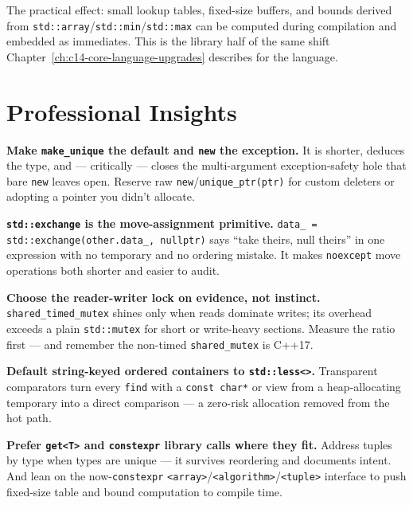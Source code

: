 The practical effect: small lookup tables, fixed-size buffers, and bounds derived from \texttt{std::array}/\texttt{std::min}/\texttt{std::max} can be computed during compilation and embedded as immediates. This is the library half of the same shift Chapter~\ref{ch:c14-core-language-upgrades} describes for the language.

\section{Professional Insights}
\label{sec:c14-stdlib-insights}

\textbf{Make \texttt{make\_unique} the default and \texttt{new} the exception.} It is shorter, deduces the type, and --- critically --- closes the multi-argument exception-safety hole that bare \texttt{new} leaves open. Reserve raw \texttt{new}/\texttt{unique\_ptr(ptr)} for custom deleters or adopting a pointer you didn't allocate.

\textbf{\texttt{std::exchange} is the move-assignment primitive.} \texttt{data\_ = std::exchange(other.data\_, nullptr)} says ``take theirs, null theirs'' in one expression with no temporary and no ordering mistake. It makes \texttt{noexcept} move operations both shorter and easier to audit.

\textbf{Choose the reader-writer lock on evidence, not instinct.} \texttt{shared\_timed\_mutex} shines only when reads dominate writes; its overhead exceeds a plain \texttt{std::mutex} for short or write-heavy sections. Measure the ratio first --- and remember the non-timed \texttt{shared\_mutex} is C++17.

\textbf{Default string-keyed ordered containers to \texttt{std::less<>}.} Transparent comparators turn every \texttt{find} with a \texttt{const char*} or view from a heap-allocating temporary into a direct comparison --- a zero-risk allocation removed from the hot path.

\textbf{Prefer \texttt{get<T>} and \texttt{constexpr} library calls where they fit.} Address tuples by type when types are unique --- it survives reordering and documents intent. And lean on the now-\texttt{constexpr} \texttt{<array>}/\texttt{<algorithm>}/\texttt{<tuple>} interface to push fixed-size table and bound computation to compile time.
